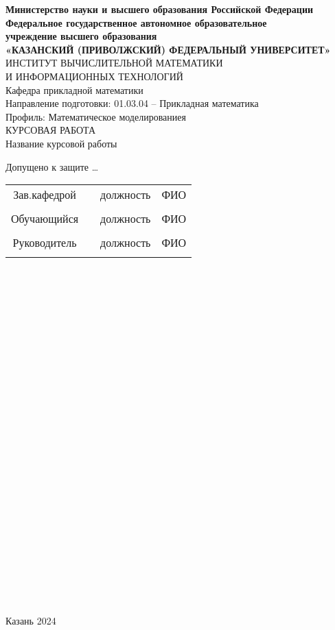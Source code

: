 \documentclass[14pt]{article}
\begin{document}
 
\begin{center}
\hfill \break
\textbf{\normalsize{Министерство науки и высшего образования Российской Федерации\\
Федеральное государственное автономное образовательное\\
учреждение высшего образования}}
\\
\normalsize{\textbf{«КАЗАНСКИЙ (ПРИВОЛЖСКИЙ) ФЕДЕРАЛЬНЫЙ УНИВЕРСИТЕТ»}}\\
\hfill \break
\normalsize{ИНСТИТУТ ВЫЧИСЛИТЕЛЬНОЙ МАТЕМАТИКИ\\ И ИНФОРМАЦИОННЫХ ТЕХНОЛОГИЙ}\\
 \hfill \break
\normalsize{Кафедра прикладной математики}\\
\hfill\break
\hfill \break
\normalsize{Направление подготовки: 01.03.04 – Прикладная математика}\\
\normalsize{Профиль: Математическое моделированиея}\\
\hfill \break
\hfill \break
КУРСОВАЯ РАБОТА\\
\hfill \break
Название курсовой работы\\
\hfill \break
\hfill \break
\end{center}
 
\normalsize{\hspace{2mm}Допущено к защите \dots } \hfill \break
\hfill \break
 
\normalsize{ 
\begin{tabular}{cccc}
Зав.кафедрой & \underline{\hspace{3cm}} & должность & ФИО \\\\
Обучающийся & \underline{\hspace{3cm}} & должность & ФИО \\\\
Руководитель & \underline{\hspace{3cm}}& должность & ФИО \\\\
\end{tabular}
}\\
\\
\\
\\
\\
\\
\\
\\
\\
\\
\\
\\
\\
\\
\\
\\
\\
\\
\\
\\
\\
\\
\\
\\
\\
\begin{center} Казань 2024 \end{center}
\thispagestyle{empty}
 
\end{document}
